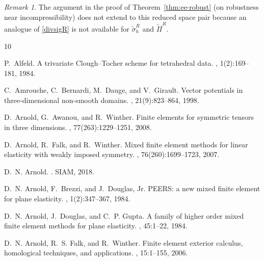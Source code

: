 \documentclass[12pt]{amsart}
\numberwithin{equation}{section}
\theoremstyle{definition}
\theoremstyle{remark}
\newtheorem{remark}[theorem]{Remark}
\renewcommand{\(}{\bigl(}
\renewcommand{\)}{\bigr)}
\newcommand{\tsigma}{\tilde{\sigma}}
\begin{document}

\begin{remark}
    The argument in the proof of Theorem~\ref{thm:ee-robust} (on robustness near incompressibility) does not extend to this reduced space pair because an analogue of \eqref{divsigR} is not available for $\tsigma_h^R$ and $\tilde{\Pi}^R$. 
\end{remark}





\begin{thebibliography}{10}

P.~Alfeld.
\newblock A trivariate {Clough}--{Tocher} scheme for tetrahedral data.
, 1(2):169--181, 1984.

C.~Amrouche, C.~Bernardi, M.~Dauge, and V.~Girault.
\newblock Vector potentials in three-dimensional non-smooth domains.
, 21(9):823--864, 1998.

D.~Arnold, G.~Awanou, and R.~Winther.
\newblock Finite elements for symmetric tensors in three dimensions.
, 77(263):1229--1251, 2008.

D.~Arnold, R.~Falk, and R.~Winther.
\newblock Mixed finite element methods for linear elasticity with weakly
  imposed symmetry.
, 76(260):1699--1723, 2007.

D.~N. Arnold.
.
\newblock SIAM, 2018.

D.~N. Arnold, F.~Brezzi, and J.~Douglas, Jr.
\newblock P{EERS}: a new mixed finite element for plane elasticity.
, 1(2):347--367, 1984.

D.~N. Arnold, J.~Douglas, and C.~P. Gupta.
\newblock A family of higher order mixed finite element methods for plane
  elasticity.
, 45:1--22, 1984.

D.~N. Arnold, R.~S. Falk, and R.~Winther.
\newblock Finite element exterior calculus, homological techniques, and
  applications.
, 15:1--155, 2006.


\end{thebibliography}
\end{document}
